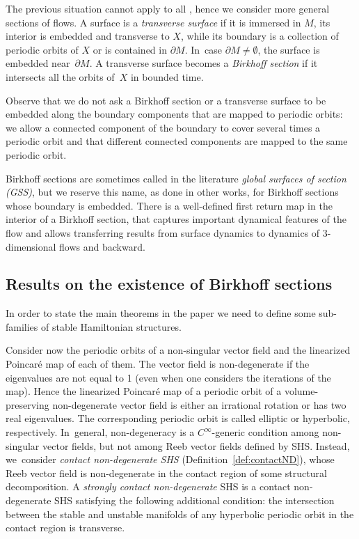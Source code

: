 The previous situation cannot apply to all \threemanifolds, hence we consider more general sections of flows.
A surface is a \emph{transverse surface} if it is immersed in $M$, its interior is embedded and transverse to $X$, while its boundary is a collection of periodic orbits of $X$ or is contained in $\partial M$. In~case $\partial M\neq \emptyset$, the surface is embedded near~$\partial M$. A transverse surface becomes a \emph{Birkhoff section} if it intersects all the orbits of~$X$ in bounded time.

Observe that we do not ask a Birkhoff section or a transverse surface to be embedded along the boundary components that are mapped to periodic orbits: we allow a connected component of the boundary to cover several times a periodic orbit and that different connected components are mapped to the same periodic orbit.

Birkhoff sections are sometimes called in the literature \emph{global surfaces of section (GSS)}, but we reserve this name, as done in other works, for Birkhoff sections whose boundary is embedded. There is a well-defined first return map in the interior of a Birkhoff section, that captures important dynamical features of the flow and allows transferring results from surface dynamics to dynamics of 3-dimensional flows and backward.

\subsection{Results on the existence of Birkhoff sections} In order to state the main theorems in the paper we need to define some sub-families of stable Hamiltonian structures.

Consider now the periodic orbits of a non-singular vector field and the linearized Poincaré map of each of them.
The vector field is non-degenerate if the eigenvalues are not equal to 1 (even when one considers the iterations of the map). Hence the linearized Poincaré map of a periodic orbit of a volume-preserving non-degenerate vector field is either an irrational rotation or has two real eigenvalues. The corresponding periodic orbit is called elliptic or hyperbolic, respectively. In~general, non-degeneracy is a $C^\infty$\nobreakdash-generic condition among non-singular vector fields, but not among Reeb vector fields defined by SHS. Instead, we~consider \emph{contact non-degenerate SHS} (Definition~\ref{def:contactND}), whose Reeb vector field is non-degenerate in the contact region of some structural decomposition. A \emph{strongly contact non-degenerate} SHS is a contact non-degenerate SHS satisfying the following additional condition: the intersection between the stable and unstable manifolds of any hyperbolic periodic orbit in the contact region is transverse.

